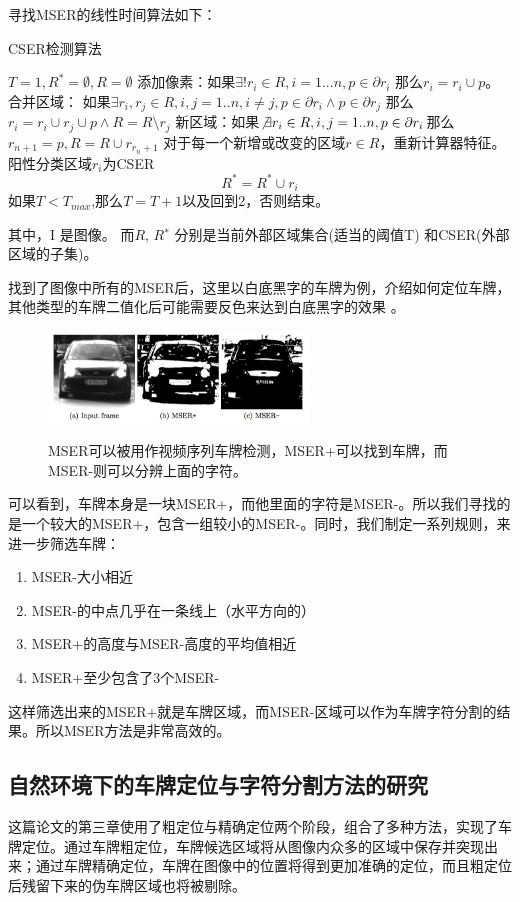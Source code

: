 寻找MSER的线性时间算法如下：
\begin{algorithm}
\caption{CSER检测算法}
    \begin{algorithmic}[1]
    \State $T=1, R^*=\emptyset, R=\emptyset$
        \State 添加像素：如果$\exists!r_i\in R, i=1...n, p \in \partial r_i$ 那么$r_i=r_i \cup p$。
        \State 合并区域： 如果$\exists r_i,r_j \in R,i,j=1..n, i \neq j, p \in \partial r_i \land p \in \partial r_j$ 那么 $r_i=r_i \cup r_j \cup p \land R=R\setminus r_j$
        \State 新区域：如果$\not \exists r_i \in R,i,j=1..n, p \in \partial r_i$那么$r_{n+1}=p, R=R \cup r_{r_n+1}$
    \EndFor
    \State 对于每一个新增或改变的区域$r \in R$，重新计算器特征。阳性分类区域$r_i$为CSER
    $$R^*=R^* \cup r_i$$
    \State 如果$T < T_{max}$,那么$T=T+1$以及回到2，否则结束。
    \end{algorithmic}
\end{algorithm}

其中，I 是图像。 而$R$, $R^∗$ 分别是当前外部区域集合(适当的阈值T) 和CSER(外部区域的子集)。

找到了图像中所有的MSER后，这里以白底黑字的车牌为例，介绍如何定位车牌，其他类型的车牌二值化后可能需要反色来达到白底黑字的效果 。
\begin{figure}[H]
    \centering 
    \includegraphics[width=0.618\textwidth]{image/2_4_2.jpg}    
    \label{logic}
    \caption{MSER可以被用作视频序列车牌检测，MSER+可以找到车牌，而MSER-则可以分辨上面的字符。}
\end{figure}
可以看到，车牌本身是一块MSER+，而他里面的字符是MSER-。所以我们寻找的是一个较大的MSER+，包含一组较小的MSER-。同时，我们制定一系列规则，来进一步筛选车牌：
\begin{enumerate}
\item
MSER-大小相近
\item
MSER-的中点几乎在一条线上（水平方向的）
\item
MSER+的高度与MSER-高度的平均值相近
\item
MSER+至少包含了3个MSER-
\end{enumerate}
这样筛选出来的MSER+就是车牌区域，而MSER-区域可以作为车牌字符分割的结果。所以MSER方法是非常高效的。
\subsection{自然环境下的车牌定位与字符分割方法的研究}
这篇论文\cite{ysy_natrue}的第三章使用了粗定位与精确定位两个阶段，组合了多种方法，实现了车牌定位。通过车牌粗定位，车牌候选区域将从图像内众多的区域中保存并突现出来；通过车牌精确定位，车牌在图像中的位置将得到更加准确的定位，而且粗定位后残留下来的伪车牌区域也将被剔除。 


